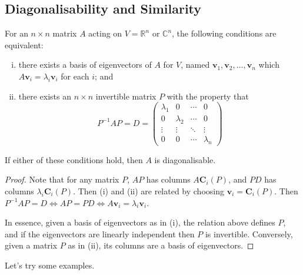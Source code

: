 \documentclass{article}
\begin{document}
\subsection{Diagonalisability and Similarity}
\begin{proposition}
	For an $n \times n$ matrix $A$ acting on $V = \mathbb R^n$ or $\mathbb C^n$, the following conditions are equivalent:
	\begin{enumerate}[(i)]
		\item there exists a basis of eigenvectors of $A$ for $V$, named $\bm v_1, \bm v_2, \dots, \bm v_n$ which $A\bm v_i = \lambda_i\bm v_i$ for each $i$; and
		\item there exists an $n \times n$ invertible matrix $P$ with the property that
		      \[ P^{-1}AP = D = \begin{pmatrix}
				      \lambda_1 & 0         & \cdots & 0         \\
				      0         & \lambda_2 & \cdots & 0         \\
				      \vdots    & \vdots    & \ddots & \vdots    \\
				      0         & 0         & \cdots & \lambda_n
			      \end{pmatrix} \]
	\end{enumerate}
	If either of these conditions hold, then $A$ is diagonalisable.
\end{proposition}
\begin{proof}
	Note that for any matrix $P$, $AP$ has columns $A\bm C_i(P)$, and $PD$ has columns $\lambda_i \bm C_i(P)$. Then (i) and (ii) are related by choosing $\bm v_i = \bm C_i(P)$. Then $P^{-1}AP = D \iff AP = PD \iff A\bm v_i = \lambda_i\bm v_i$.

	In essence, given a basis of eigenvectors as in (i), the relation above defines $P$, and if the eigenvectors are linearly independent then $P$ is invertible. Conversely, given a matrix $P$ as in (ii), its columns are a basis of eigenvectors.
\end{proof}
Let's try some examples.
\end{document}
